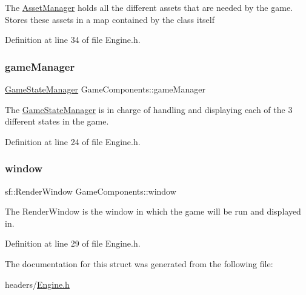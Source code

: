 The \mbox{\hyperlink{class_asset_manager}{Asset\+Manager}} holds all the different assets that are needed by the game. Stores these assets in a map contained by the class itself 

Definition at line 34 of file Engine.\+h.

\mbox{\label{struct_game_components_a9ff8e64fce57ab014b3b7909d22261b1}} 
\subsubsection{\texorpdfstring{gameManager}{gameManager}}
{\footnotesize\ttfamily \mbox{\hyperlink{class_game_state_manager}{Game\+State\+Manager}} Game\+Components\+::game\+Manager}

The \mbox{\hyperlink{class_game_state_manager}{Game\+State\+Manager}} is in charge of handling and displaying each of the 3 different states in the game. 

Definition at line 24 of file Engine.\+h.

\mbox{\label{struct_game_components_a0a416384259309e866d443f495855d07}} 
\subsubsection{\texorpdfstring{window}{window}}
{\footnotesize\ttfamily sf\+::\+Render\+Window Game\+Components\+::window}

The Render\+Window is the window in which the game will be run and displayed in. 

Definition at line 29 of file Engine.\+h.



The documentation for this struct was generated from the following file\+:\begin{DoxyCompactItemize}
\item 
headers/\mbox{\hyperlink{_engine_8h}{Engine.\+h}}\end{DoxyCompactItemize}
